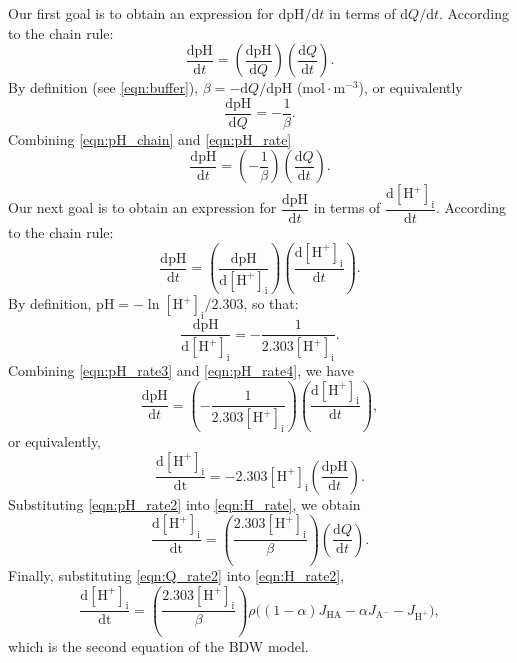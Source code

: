 \documentclass[fleqn,10pt]{physiome}
\begin{document}
Our first goal is to obtain an expression for $\mathrm{d}{\mathrm{pH}}/\mathrm{d}t$ in terms of $\mathrm{d}Q/\mathrm{d}t$. According to the chain rule:
\begin{equation}
\dfrac{\mathrm{dpH}}{\mathrm{d}t}=\left(\dfrac{\mathrm{dpH}}{\mathrm{d}Q}\right) \left(\dfrac{\mathrm{d}Q}{\mathrm{d}t}\right).
\label{eqn:pH_chain}
\end{equation}
By definition (see \autoref{eqn:buffer}), $\beta=-{\mathrm{d}Q}/{\mathrm{dpH}}$ ($\mathrm{mol\cdot m^{-3}}$), or equivalently
\begin{equation}
\dfrac{\mathrm{dpH}}{\mathrm{d}Q}=-\dfrac{1}{\beta}.
\label{eqn:pH_rate}
\end{equation}
Combining \autoref{eqn:pH_chain} and \autoref{eqn:pH_rate}
\begin{equation}
\dfrac{\mathrm{dpH}}{\mathrm{d}t}=\left(-\dfrac{1}{\beta}\right)\left(\dfrac{\mathrm{d}Q}{\mathrm{d}t}\right).
\label{eqn:pH_rate2}
\end{equation}
Our next goal is to obtain an expression for $\dfrac{\mathrm{dpH}}{\mathrm{d}t}$ in terms of $\dfrac{\mathrm{d[H^+]_i}}{\mathrm{d}t}$. According to the chain rule:
\begin{equation}
\dfrac{\mathrm{dpH}}{\mathrm{d}t}=\left(\dfrac{\mathrm{dpH}}{\mathrm{d[H^+]_i}}\right)\left( \dfrac{\mathrm{d[H^+]_i}}{\mathrm{d}t}\right).
\label{eqn:pH_rate3}
\end{equation}
By definition, $\mathrm{pH}={-\ln{\mathrm{[H^+]_i}}}/{2.303}$, so that:
\begin{equation}
\dfrac{\mathrm{dpH}}{\mathrm{d}{\mathrm{[H^+]_i}}}=-\dfrac{1}{2.303\mathrm{[H^+]_i}}.
\label{eqn:pH_rate4}
\end{equation}
Combining \autoref{eqn:pH_rate3} and \autoref{eqn:pH_rate4}, we have
\begin{equation}
\dfrac{\mathrm{dpH}}{\mathrm{d}t}=\left(-\dfrac{1}{2.303\mathrm{[H^+]_i}}\right)\left(\dfrac{\mathrm{d}\mathrm{[H^+]_i}}{\mathrm{d}t}\right),
\end{equation}
or equivalently,
\begin{equation}
\dfrac{\mathrm{d[H^+]_i}}{\mathrm{dt}}=-2.303\mathrm{[H^+]_i}\left(\dfrac{\mathrm{dpH}}{\mathrm{d}t}\right).
\label{eqn:H_rate}
\end{equation}
Substituting \autoref{eqn:pH_rate2} into \autoref{eqn:H_rate}, we obtain
\begin{equation}
\dfrac{\mathrm{d[H^+]_i}}{\mathrm{dt}}=\left(\dfrac{2.303\mathrm{[H^+]_i}}{\beta}\right)\left(\dfrac{\mathrm{d}Q}{\mathrm{d}t}\right).
\label{eqn:H_rate2}
\end{equation}
Finally, substituting \autoref{eqn:Q_rate2} into \autoref{eqn:H_rate2},
\begin{equation}
\dfrac{\mathrm{d[H^+]_i}}{\mathrm{dt}}=\left(\dfrac{2.303\mathrm{[H^+]_i}}{\beta}\right) \rho\bigg((1-\alpha)J_\mathrm{HA}-\alpha J_\mathrm{A^-}-J_\mathrm{H^+}\bigg),
\label{eqn:H_rate3}
\end{equation}
which is the second equation of the BDW model.
\end{document}
